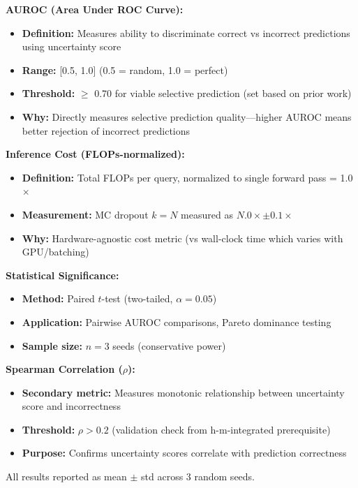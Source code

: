 \textbf{AUROC (Area Under ROC Curve):}
\begin{itemize}
    \item \textbf{Definition:} Measures ability to discriminate correct vs incorrect predictions using uncertainty score
    \item \textbf{Range:} [0.5, 1.0] (0.5 = random, 1.0 = perfect)
    \item \textbf{Threshold:} $\geq$ 0.70 for viable selective prediction (set based on prior work)
    \item \textbf{Why:} Directly measures selective prediction quality---higher AUROC means better rejection of incorrect predictions
\end{itemize}

\textbf{Inference Cost (FLOPs-normalized):}
\begin{itemize}
    \item \textbf{Definition:} Total FLOPs per query, normalized to single forward pass = 1.0$\times$
    \item \textbf{Measurement:} MC dropout $k=N$ measured as $N.0\times \pm 0.1\times$
    \item \textbf{Why:} Hardware-agnostic cost metric (vs wall-clock time which varies with GPU/batching)
\end{itemize}

\textbf{Statistical Significance:}
\begin{itemize}
    \item \textbf{Method:} Paired $t$-test (two-tailed, $\alpha = 0.05$)
    \item \textbf{Application:} Pairwise AUROC comparisons, Pareto dominance testing
    \item \textbf{Sample size:} $n=3$ seeds (conservative power)
\end{itemize}

\textbf{Spearman Correlation ($\rho$):}
\begin{itemize}
    \item \textbf{Secondary metric:} Measures monotonic relationship between uncertainty score and incorrectness
    \item \textbf{Threshold:} $\rho > 0.2$ (validation check from h-m-integrated prerequisite)
    \item \textbf{Purpose:} Confirms uncertainty scores correlate with prediction correctness
\end{itemize}

All results reported as mean $\pm$ std across 3 random seeds.
